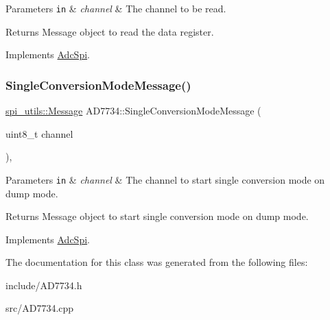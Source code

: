 \begin{DoxyParams}[1]{Parameters}
\mbox{\tt in}  & {\em channel} & The channel to be read. \\
\hline
\end{DoxyParams}
\begin{DoxyReturn}{Returns}
Message object to read the data register. 
\end{DoxyReturn}


Implements \mbox{\hyperlink{classAdcSpi_a3578f18e1976d9e2b075a3fbdc003517}{Adc\+Spi}}.

\mbox{\label{classAD7734_af677fbfbae0ec1c78b453ceb4a6736ec}} 
\subsubsection{\texorpdfstring{Single\+Conversion\+Mode\+Message()}{SingleConversionModeMessage()}}
{\footnotesize\ttfamily \mbox{\hyperlink{structspi__utils_1_1Message}{spi\+\_\+utils\+::\+Message}} A\+D7734\+::\+Single\+Conversion\+Mode\+Message (\begin{DoxyParamCaption}\item[{uint8\+\_\+t}]{channel }\end{DoxyParamCaption})\hspace{0.3cm}{\ttfamily [protected]}, {\ttfamily [virtual]}}


\begin{DoxyParams}[1]{Parameters}
\mbox{\tt in}  & {\em channel} & The channel to start single conversion mode on dump mode. \\
\hline
\end{DoxyParams}
\begin{DoxyReturn}{Returns}
Message object to start single conversion mode on dump mode. 
\end{DoxyReturn}


Implements \mbox{\hyperlink{classAdcSpi_a369da36232861640a113792d2398ce44}{Adc\+Spi}}.



The documentation for this class was generated from the following files\+:\begin{DoxyCompactItemize}
\item 
include/A\+D7734.\+h\item 
src/A\+D7734.\+cpp\end{DoxyCompactItemize}
